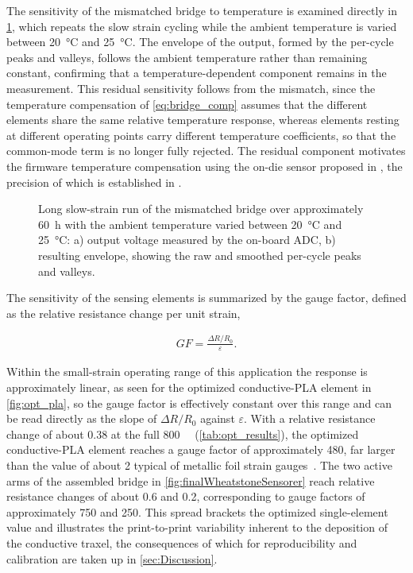 The sensitivity of the mismatched bridge to temperature is examined directly in \cref{fig:sidsteTest}, which repeats the slow strain cycling while the ambient temperature is varied between \SI{20}{\celsius} and \SI{25}{\celsius}. The envelope of the output, formed by the per-cycle peaks and valleys, follows the ambient temperature rather than remaining constant, confirming that a temperature-dependent component remains in the measurement. This residual sensitivity follows from the mismatch, since the temperature compensation of \cref{eq:bridge_comp} assumes that the different elements share the same relative temperature response, whereas elements resting at different operating points carry different temperature coefficients, so that the common-mode term is no longer fully rejected. The residual component motivates the firmware temperature compensation using the on-die sensor proposed in , the precision of which is established in .

\begin{figure}
\centering

    \caption{Long slow-strain run of the mismatched bridge over approximately \SI{60}{\hour} with the ambient temperature varied between \SI{20}{\celsius} and \SI{25}{\celsius}: a) output voltage measured by the on-board ADC, b) resulting envelope, showing the raw and smoothed per-cycle peaks and valleys.}
    \label{fig:sidsteTest}
\end{figure}

The sensitivity of the sensing elements is summarized by the gauge factor, defined as the relative resistance change per unit strain,

\begin{align}\label{eq:gauge_factor}
    \mathit{GF} = \frac{\Delta R / R_0}{\varepsilon}.
\end{align}

Within the small-strain operating range of this application the response is approximately linear, as seen for the optimized conductive-PLA element in \cref{fig:opt_pla}, so the gauge factor is effectively constant over this range and can be read directly as the slope of \(\Delta R / R_0\) against \(\varepsilon\). With a relative resistance change of about \num{0.38} at the full \SI{800}{\micro\strain} (\cref{tab:opt_results}), the optimized conductive-PLA element reaches a gauge factor of approximately \num{480}, far larger than the value of about \num{2} typical of metallic foil strain gauges~\cite{metal_gauge}. The two active arms of the assembled bridge in \cref{fig:finalWheatstoneSensorer} reach relative resistance changes of about \num{0.6} and \num{0.2}, corresponding to gauge factors of approximately \num{750} and \num{250}. This spread brackets the optimized single-element value and illustrates the print-to-print variability inherent to the deposition of the conductive traxel, the consequences of which for reproducibility and calibration are taken up in \cref{sec:Discussion}.